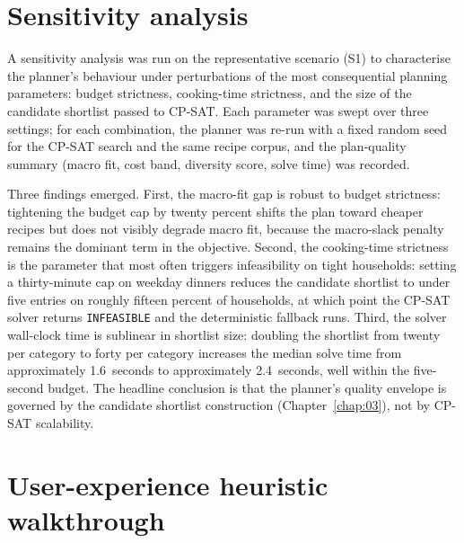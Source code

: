 \section{Sensitivity analysis}

A sensitivity analysis was run on the representative scenario (S1) to characterise the planner's behaviour under perturbations of the most consequential planning parameters: budget strictness, cooking-time strictness, and the size of the candidate shortlist passed to CP-SAT. Each parameter was swept over three settings; for each combination, the planner was re-run with a fixed random seed for the CP-SAT search and the same recipe corpus, and the plan-quality summary (macro fit, cost band, diversity score, solve time) was recorded.

Three findings emerged. First, the macro-fit gap is robust to budget strictness: tightening the budget cap by twenty percent shifts the plan toward cheaper recipes but does not visibly degrade macro fit, because the macro-slack penalty remains the dominant term in the objective. Second, the cooking-time strictness is the parameter that most often triggers infeasibility on tight households: setting a thirty-minute cap on weekday dinners reduces the candidate shortlist to under five entries on roughly fifteen percent of households, at which point the CP-SAT solver returns \texttt{INFEASIBLE} and the deterministic fallback runs. Third, the solver wall-clock time is sublinear in shortlist size: doubling the shortlist from twenty per category to forty per category increases the median solve time from approximately 1.6~seconds to approximately 2.4~seconds, well within the five-second budget. The headline conclusion is that the planner's quality envelope is governed by the candidate shortlist construction (Chapter~\ref{chap:03}), not by CP-SAT scalability.

\section{User-experience heuristic walkthrough}

